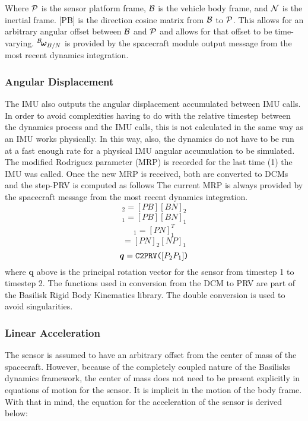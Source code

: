 Where $\cal{P}$ is the sensor platform frame, $\cal{B}$ is the vehicle body frame, and $\cal{N}$ is the inertial frame. [PB] is the direction cosine matrix from $\cal{B}$ to $\cal{P}$. This allows for an arbitrary angular offset between $\cal{B}$ and $\cal{P}$ and allows for that offset to be time-varying. $\leftexp{B}{\bm{\omega}_{B/N}}$ is provided by the spacecraft module output message from the most recent dynamics integration.

\subsubsection{Angular Displacement}
The IMU also outputs the angular displacement accumulated between IMU calls. In order to avoid complexities having to do with the relative timestep between the dynamics process and the IMU calls, this is not calculated in the same way as an IMU works physically. In this way, also, the dynamics do not have to be run at a fast enough rate for a physical IMU angular accumulation to be simulated. 
The modified Rodriguez parameter (MRP) is recorded for the last time (1) the IMU was called. Once the new MRP is received, both are converted to DCMs and the step-PRV is computed as follows The current MRP is always provided by the spacecraft message from the most recent dynamics integration.
\begin{equation}
	[PN]_2 = [PB][BN]_2
\end{equation}
\begin{equation}
	[PN]_1 = [PB][BN]_1
\end{equation}
\begin{equation}
	[NP]_1 = [PN]_1^T
\end{equation}
\begin{equation}
	[P_2P_1] = [PN]_2[NP]_1
\end{equation}
\begin{equation}
\bm{q} = \verb|C2PRV(|[P_2P_1]\verb|)|
\end{equation}
where $\bm{q}$ above is the principal rotation vector for the sensor from timestep 1 to timestep 2. The functions used in conversion from the DCM to PRV are part of the Basilisk Rigid Body Kinematics library. The double conversion is used to avoid singularities.

\subsubsection{Linear Acceleration}
The sensor is assumed to have an arbitrary offset from the center of mass of the spacecraft. However, because of the completely coupled nature of the Basilisks dynamics framework, the center of mass does not need to be present explicitly in equations of motion for the sensor. It is implicit in the motion of the body frame. With that in mind, the equation for the acceleration of the sensor is derived below:

